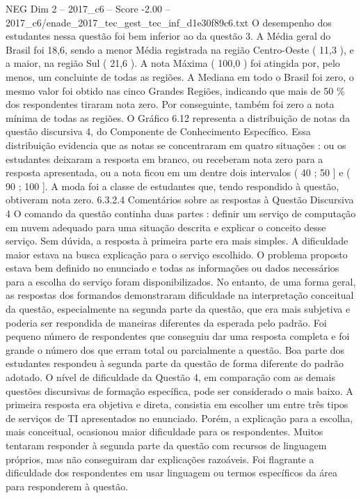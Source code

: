 \begin{textsample}{NEG Dim 2 – 2017\_c6 – Score -2.00 – 2017\_c6/enade\_2017\_tec\_gest\_tec\_inf\_d1e30f89c6.txt}
O desempenho dos estudantes nessa questão foi bem inferior ao da questão 3.
A Média geral do Brasil foi 18,6, sendo a menor Média registrada na região Centro-Oeste ( 11,3 ), e a maior, na região Sul ( 21,6 ).
A nota Máxima ( 100,0 ) foi atingida por, pelo menos, um concluinte de todas as regiões.
A Mediana em todo o Brasil foi zero, o mesmo valor foi obtido nas cinco Grandes Regiões, indicando que mais de 50 \% dos respondentes tiraram nota zero.
Por conseguinte, também foi zero a nota mínima de todas as regiões.
O Gráfico 6.12 representa a distribuição de notas da questão discursiva 4, do Componente de Conhecimento Específico.
Essa distribuição evidencia que as notas se concentraram em quatro situações : ou os estudantes deixaram a resposta em branco, ou receberam nota zero para a resposta apresentada, ou a nota ficou em um dentre dois intervalos ( 40 ; 50 ] e ( 90 ; 100 ].
A moda foi a classe de estudantes que, tendo respondido à questão, obtiveram nota zero. 6.3.2.4 Comentários sobre as respostas à Questão Discursiva 4 O comando da questão continha duas partes : definir um serviço de computação em nuvem adequado para uma situação descrita e explicar o conceito desse serviço.
Sem dúvida, a resposta à primeira parte era mais simples.
A dificuldade maior estava na busca explicação para o serviço escolhido.
O problema proposto estava bem definido no enunciado e todas as informações ou dados necessários para a escolha do serviço foram disponibilizados.
No entanto, de uma forma geral, as respostas dos formandos demonstraram dificuldade na interpretação conceitual da questão, especialmente na segunda parte da questão, que era mais subjetiva e poderia ser respondida de maneiras diferentes da esperada pelo padrão.
Foi pequeno número de respondentes que conseguiu dar uma resposta completa e foi grande o número dos que erram total ou parcialmente a questão.
Boa parte dos estudantes respondeu à segunda parte da questão de forma diferente do padrão adotado.
O nível de dificuldade da Questão 4, em comparação com as demais questões discursivas de formação específica, pode ser considerado o mais baixo.
A primeira resposta era objetiva e direta, consistia em escolher um entre três tipos de serviços de TI apresentados no enunciado.
Porém, a explicação para a escolha, mais conceitual, ocasionou maior dificuldade para os respondentes.
Muitos tentaram responder à segunda parte da questão com recursos de linguagem próprios, mas não conseguiram dar explicações razoáveis.
Foi flagrante a dificuldade dos respondentes em usar linguagem ou termos específicos da área para responderem à questão.

\end{textsample}
